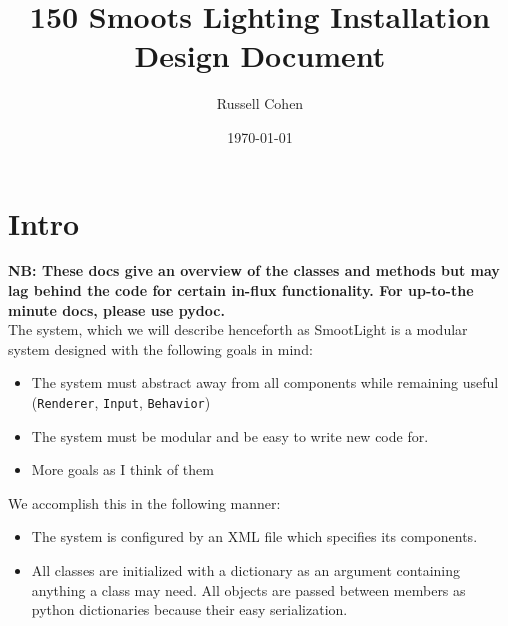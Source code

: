 \documentclass{article}
\begin{document}
    \title{150 Smoots Lighting Installation Design Document}
    \author{Russell Cohen}
    \date{\today}
    \maketitle
    \newcommand{\classDoc}[5]{
        \subsection{#1}
            \begin{itemize}
            \item \textbf{Inherits from: } #2 
            \item \textbf{Inherited by: } #3 
            \item \textbf{Brief Description: } #4 
            \item \textbf{Argument Requirements: } #5
            \end{itemize}
        }
    \section{Intro}
        \textbf{NB: These docs give an overview of the classes and methods but
            may lag behind the code for certain in-flux functionality.  For
                up-to-the minute docs, please use pydoc.} \\
        The system, which we will describe henceforth as SmootLight is a
        modular system designed with the following goals in mind:
        \begin{itemize} 
            \item The system must abstract away from all components while
            remaining useful (\verb=Renderer=, \verb=Input=, \verb=Behavior=) 
            \item The system must be modular and be easy to write new code for.
            \item More goals as I think of them
        \end{itemize}
        We accomplish this in the following manner:
        \begin{itemize}
            \item The system is configured by an XML file which specifies its
            components.
            \item All classes are initialized with a dictionary as an argument
                containing anything a class may need.  All objects are passed
                between members as python dictionaries because their easy
                serialization.
        \end{itemize}
\end{document}
